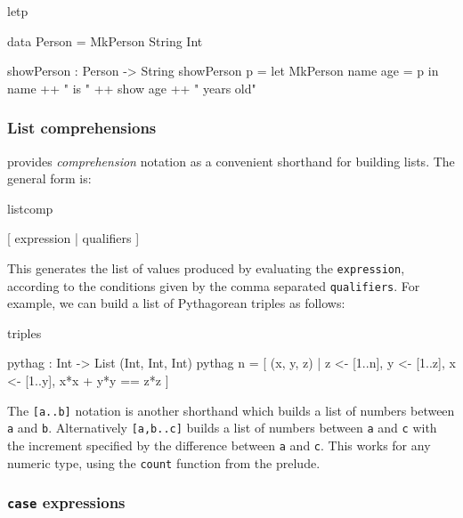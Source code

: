 \begin{SaveVerbatim}{letp}

data Person = MkPerson String Int

showPerson : Person -> String
showPerson p = let MkPerson name age = p in
                   name ++ " is " ++ show age ++ " years old"

\end{SaveVerbatim}

\subsubsection*{List comprehensions}

\label{sec:listcomp}

\Idris{} provides \emph{comprehension} notation as a convenient shorthand for
building lists. The general form is:

\begin{SaveVerbatim}{listcomp}

[ expression | qualifiers ]

\end{SaveVerbatim}

\noindent
This generates the list of values produced by evaluating the
\texttt{expression}, according to the conditions given by the comma separated
\texttt{qualifiers}. For example, we can build a list of Pythagorean triples as
follows:

\begin{SaveVerbatim}{triples}

pythag : Int -> List (Int, Int, Int)
pythag n = [ (x, y, z) | z <- [1..n], y <- [1..z], x <- [1..y],
                         x*x + y*y == z*z ]
  
\end{SaveVerbatim}

\noindent
The \texttt{[a..b]} notation is another shorthand which builds a list of
numbers between \texttt{a} and \texttt{b}.  Alternatively \texttt{[a,b..c]}
builds a list of numbers between \texttt{a} and \texttt{c} with the increment
specified by the difference between \texttt{a} and \texttt{c}.  This works for
any numeric type, using the \texttt{count} function from the prelude. 

\subsubsection*{\texttt{case} expressions}

